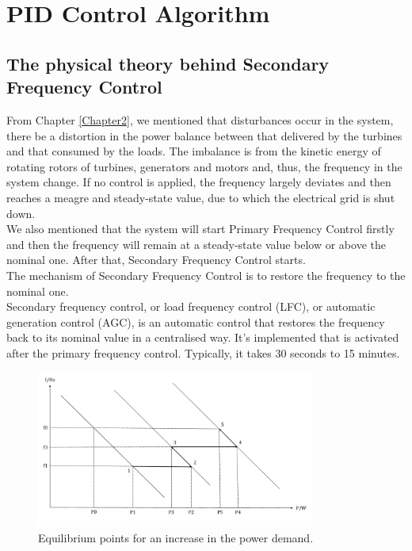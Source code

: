 \documentclass{report}
\begin{document}
\chapter{PID Control Algorithm}
\label{Chapter3}
\section{The physical theory behind Secondary Frequency Control} %
From Chapter \textcolor{red}{\ref{Chapter2}}, we mentioned that disturbances occur in the system, there be a distortion in the power balance between that delivered by the turbines and that consumed by the loads. The imbalance is from the kinetic energy of rotating rotors of turbines, generators and motors and, thus, the frequency in the system change. If no control is applied, the frequency largely deviates and then reaches a meagre and steady-state value, due to which the electrical grid is shut down. \\

We also mentioned that the system will start Primary Frequency Control firstly and then the frequency will remain at a steady-state value below or above the nominal one. After that, Secondary Frequency Control starts.\\

The mechanism of Secondary Frequency Control is to restore the frequency to the nominal one.\\

Secondary frequency control, or load frequency control (LFC), or automatic generation control (AGC), is an automatic control that restores the frequency back to its nominal value in a centralised way. It's implemented that is activated after the primary frequency control. Typically, it takes 30 seconds to 15 minutes.\\

\begin{figure}[htbp]
\centering
\includegraphics[width = 0.816\textwidth]{figure/3_1_Equilibrium.pdf}
\caption{Equilibrium points for an increase in the power demand.}
\label{3_1_Equilibrium}
\end{figure}
\end{document}

